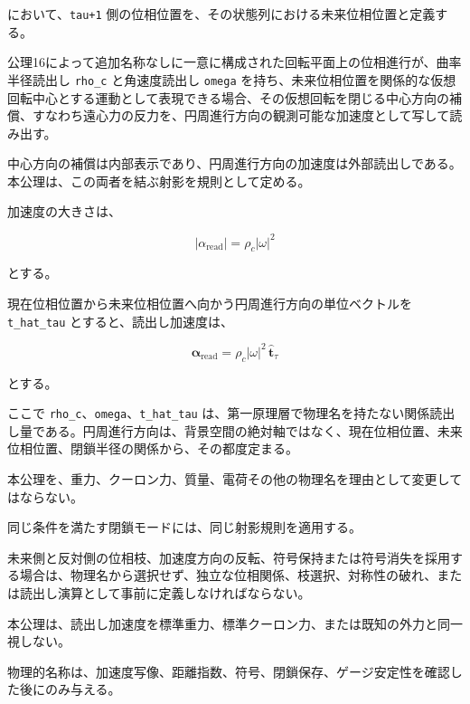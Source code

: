 \documentclass[
  a4paper,
]{ltjsarticle}
\begin{document}
において、\texttt{tau+1}
側の位相位置を、その状態列における未来位相位置と定義する。

公理16によって追加名称なしに一意に構成された回転平面上の位相進行が、曲率半径読出し
\texttt{rho\_c} と角速度読出し \texttt{omega}
を持ち、未来位相位置を関係的な仮想回転中心とする運動として表現できる場合、その仮想回転を閉じる中心方向の補償、すなわち遠心力の反力を、円周進行方向の観測可能な加速度として写して読み出す。

中心方向の補償は内部表示であり、円周進行方向の加速度は外部読出しである。本公理は、この両者を結ぶ射影を規則として定める。

加速度の大きさは、

\[
|\alpha_{\mathrm{read}}|
=\rho_c|\omega|^2
\]

とする。

現在位相位置から未来位相位置へ向かう円周進行方向の単位ベクトルを
\texttt{t\_hat\_tau} とすると、読出し加速度は、

\[
\boldsymbol{\alpha}_{\mathrm{read}}
=\rho_c|\omega|^2\,\hat{\boldsymbol{t}}_\tau
\]

とする。

ここで \texttt{rho\_c}、\texttt{omega}、\texttt{t\_hat\_tau}
は、第一原理層で物理名を持たない関係読出し量である。円周進行方向は、背景空間の絶対軸ではなく、現在位相位置、未来位相位置、閉鎖半径の関係から、その都度定まる。

本公理を、重力、クーロン力、質量、電荷その他の物理名を理由として変更してはならない。

同じ条件を満たす閉鎖モードには、同じ射影規則を適用する。

未来側と反対側の位相枝、加速度方向の反転、符号保持または符号消失を採用する場合は、物理名から選択せず、独立な位相関係、枝選択、対称性の破れ、または読出し演算として事前に定義しなければならない。

本公理は、読出し加速度を標準重力、標準クーロン力、または既知の外力と同一視しない。

物理的名称は、加速度写像、距離指数、符号、閉鎖保存、ゲージ安定性を確認した後にのみ与える。
\end{document}
